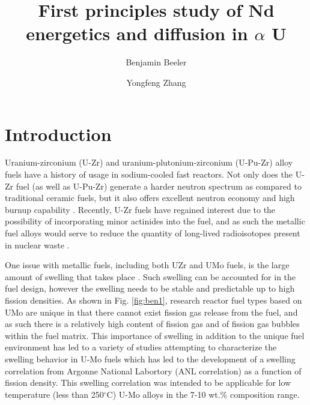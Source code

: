 \documentclass[review]{elsarticle}
\begin{document}
\begin{frontmatter}
\title{First principles study of Nd energetics and diffusion in $\alpha$ U}

\author[inl]{Benjamin Beeler}
\author[inl]{Yongfeng Zhang}
\address[inl]{Idaho National Laboratory, Idaho Falls, ID 83415}


\begin{abstract}

\end{abstract}
\end{frontmatter}

\linenumbers

\section{Introduction}

Uranium-zirconium (U-Zr) and uranium-plutonium-zirconium (U-Pu-Zr) alloy fuels have a history of usage in sodium-cooled fast reactors. Not only does the U-Zr fuel (as well as U-Pu-Zr) generate a harder neutron spectrum as compared to traditional ceramic fuels, but it also offers excellent neutron economy and high burnup capability \cite{hofman1997}. Recently, U-Zr fuels have regained interest due to the possibility of incorporating minor actinides into the fuel, and as such the metallic fuel alloys would serve to reduce the quantity of long-lived radioisotopes present in nuclear waste \cite{capriotti2017}. 

One issue with metallic fuels, including both UZr and UMo fuels, is the large amount of swelling that takes place \cite{hofman1997}. Such swelling can be accounted for in the fuel design, however the swelling needs to be stable and predictable up to high fission densities. As shown in Fig. \ref{fig:ben1}, research reactor fuel types based on UMo are unique in that there cannot exist fission gas release from the fuel, and as such there is a relatively high content of fission gas and of fission gas bubbles within the fuel matrix. This importance of swelling in addition to the unique fuel environment has led to a variety of studies attempting to characterize the swelling behavior in U-Mo fuels \cite{rest2009, kim_anl08, meyer2002, kim2013} which has led to the development of a swelling correlation from Argonne National Labortory (ANL correlation) \cite{kim2011} as a function of fission density. This swelling correlation was intended to be applicable for low temperature (less than 250$^{\circ}$C) U-Mo alloys in the 7-10 wt.\% composition range. 
\end{document}
